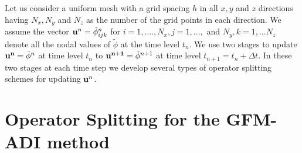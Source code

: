 Let us consider a uniform mesh with a grid spacing $h$ in all $x,y$ and $z$ directions having $N_x,N_y$ and $N_z$ as the number of the grid points in each direction. We assume the vector ${{\bf u}^n = \tilde \phi^n_{ijk}}$ for $i=1,...., N_x,j=1,...,$ and $N_y,k=1,...N_z$ denote all the nodal values of $\tilde \phi$ at the time level $t_n$. We use two stages to update ${\bf u^n}=\tilde \phi^n$ at time level $t_n$ to ${\bf u^{n+1}}=\tilde \phi^{n+1}$ at time level $t_{n+1}=t_n+ \Delta t $. In these two stages at each time step we develop several types of operator splitting schemes for updating ${\bf u}^n$. 
\section{Operator Splitting for the GFM-ADI method}
\label{sec:GFM-ADI}

